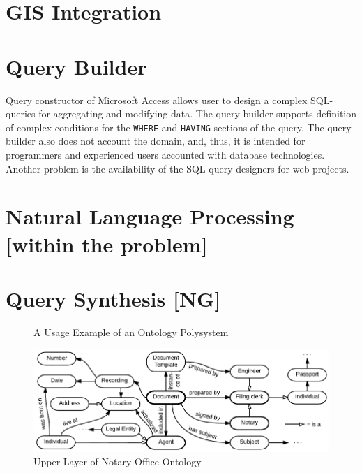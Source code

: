 \documentclass[conference]{IEEEtran}
\begin{document}
\section{GIS Integration}
\label{sec:gis-integration}



\section{Query Builder}
\label{sec:query-builder}


Query constructor of Microsoft Access allows user to design a complex SQL-queries for aggregating and modifying data.  The query builder supports definition of complex conditions for the \texttt{WHERE} and \texttt{HAVING} sections of the query.  The query builder also does not account the domain, and, thus, it is intended for programmers and experienced users accounted with database technologies.  Another problem is the availability of the SQL-query designers for web projects.


\section{Natural Language Processing [within the problem]}
\label{sec:natur-lang-proc}

\section{Query Synthesis [NG]}
\label{sec:query-synthesis-ng}


\begin{figure}
\centering\footnotesize\sf
\def\svgwidth{0.9\linewidth}

\caption{A Usage Example of an Ontology Polysystem}
\label{OPSA}
\end{figure}

\begin{figure}[!t]
\centering
\includegraphics[width=\linewidth]{DocumentOntology-en.pdf}
\caption{Upper Layer of Notary Office Ontology}
\label{notaryontology}
\end{figure}
\end{document}
